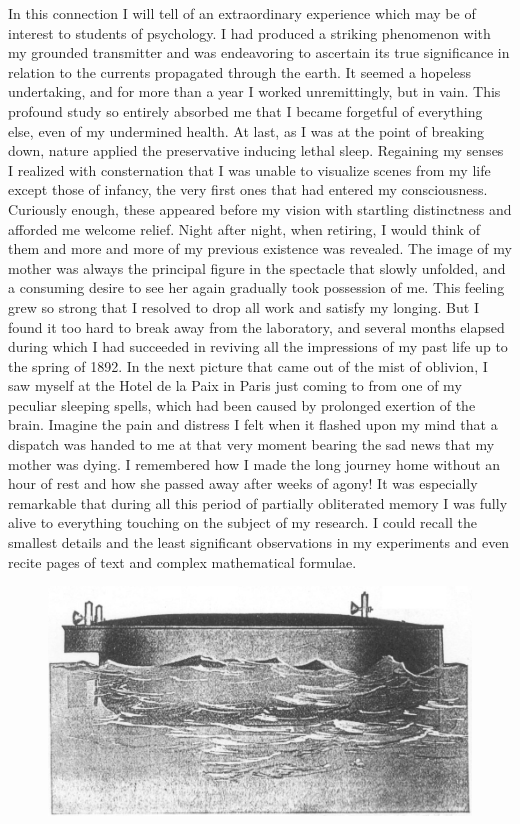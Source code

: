 \documentclass[a4paper,12pt,english,twoside,openright]{memoir}
\begin{document}
In this connection I will tell of an extraordinary experience which may be of interest to students of 
psychology.  I had produced a striking phenomenon with my grounded transmitter and was 
endeavoring to ascertain its true significance in relation to the currents propagated through the 
earth.  It seemed a hopeless undertaking, and for more than a year I worked unremittingly, but in 
vain.  This profound study so entirely absorbed me that I became forgetful of everything else, 
even of my undermined health.  At last, as I was at the point of breaking down, nature applied the 
preservative inducing lethal sleep.  Regaining my senses I realized with consternation that I was 
unable to visualize scenes from my life except those of infancy, the very first ones that had 
entered my consciousness.  Curiously enough, these appeared before my vision with startling 
distinctness and afforded me welcome relief.  Night after night, when retiring, I would think of 
them and more and more of my previous existence was revealed.  The image of my mother was 
always the principal figure in the spectacle that slowly unfolded, and a consuming desire to see 
her again gradually took possession of me.  This feeling grew so strong that I resolved to drop all 
work and satisfy my longing.  But I found it too hard to break away from the laboratory, and 
several months elapsed during which I had succeeded in reviving all the impressions of my past 
life up to the spring of 1892.  In the next picture that came out of the mist of oblivion, I saw myself 
at the Hotel de la Paix in Paris just coming to from one of my peculiar sleeping spells, which had 
been caused by prolonged exertion of the brain.  Imagine the pain and distress I felt when it 
flashed upon my mind that a dispatch was handed to me at that very moment bearing the sad 
news that my mother was dying.  I remembered how I made the long journey home without an 
hour of rest and how she passed away after weeks of agony! It was especially remarkable that 
during all this period of partially obliterated memory I was fully alive to everything touching on the 
subject of my research.  I could recall the smallest details and the least significant observations in 
my experiments and even recite pages of text and complex mathematical formulae.  

\begin{figure}[b]
	\centering
	\includegraphics[width=.75\textwidth]{TelBoat.png}
\end{figure}
\end{document}
